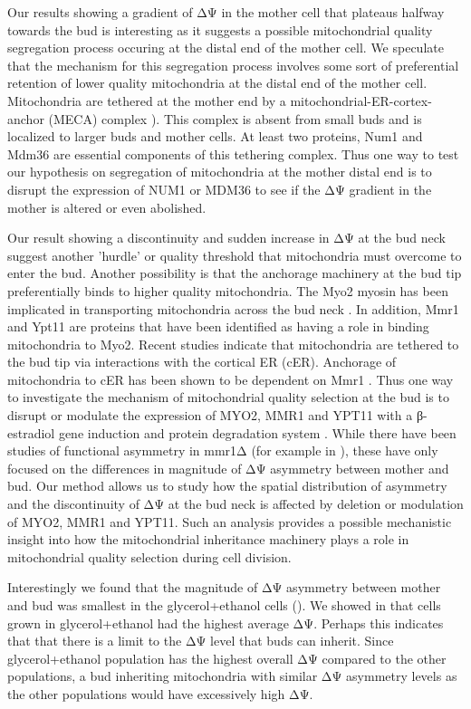 Our results showing a gradient of ΔΨ in the mother cell that plateaus halfway towards the bud is interesting as it suggests a possible mitochondrial quality segregation process occuring at the distal end of the mother cell. We speculate that the mechanism for this segregation process involves some sort of preferential retention of lower quality mitochondria at the distal end of the mother cell. Mitochondria are tethered at the mother end by a mitochondrial-ER-cortex-anchor (MECA) complex \cite{lackner2013endoplasmic}). This complex is absent from small buds and is localized to larger buds and mother cells. At least two proteins, Num1 and Mdm36 are essential components of this tethering complex. Thus one way to test our hypothesis on segregation of mitochondria at the mother distal end is to disrupt the expression of NUM1 or MDM36 to see if the ΔΨ gradient in the mother is altered or even abolished.

Our result showing a discontinuity and sudden increase in ΔΨ at the bud neck suggest another 'hurdle' or quality threshold that mitochondria must overcome to enter the bud. Another possibility is that the anchorage machinery at the bud tip preferentially binds to higher quality mitochondria. The Myo2 myosin has been implicated in transporting mitochondria across the bud neck \cite{fortsch2011myosin}. In addition, Mmr1 and Ypt11 are proteins that have been identified as having a role in binding mitochondria to Myo2. Recent studies indicate that mitochondria are tethered to the bud tip via interactions with the cortical ER (cER). Anchorage of mitochondria to cER has been shown to be dependent on Mmr1 \cite{swayne_role_2011}. Thus one way to investigate the mechanism of mitochondrial quality selection at the bud is to disrupt or modulate the expression of MYO2, MMR1 and YPT11 with a β-estradiol gene induction and protein degradation system \cite{mcisaac2011fast}. While there have been studies of functional asymmetry in mmr1Δ (for example in \cite{mcfaline-figueroa_mitochondrial_2011}), these have only focused on the differences in magnitude of ΔΨ asymmetry between mother and bud. Our method allows us to study how the spatial distribution of asymmetry and the discontinuity of ΔΨ at the bud neck is affected by deletion or modulation of MYO2, MMR1 and YPT11. Such an analysis provides a possible mechanistic insight into how the mitochondrial inheritance machinery plays a role in mitochondrial quality selection during cell division.

Interestingly we found that the magnitude of ΔΨ asymmetry between mother and bud was smallest in the glycerol+ethanol cells (). We showed in  that cells grown in glycerol+ethanol had the highest average ΔΨ. Perhaps this indicates that that there is a limit to the ΔΨ level that buds can inherit. Since glycerol+ethanol population has the highest overall ΔΨ compared to the other populations, a bud inheriting mitochondria with similar ΔΨ asymmetry levels as the other populations would have excessively high ΔΨ.

